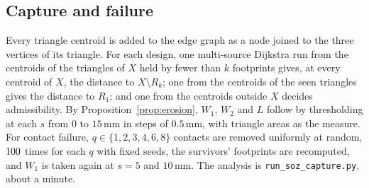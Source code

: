 \documentclass[11pt]{amsart}
\theoremstyle{definition}
\theoremstyle{remark}
\begin{document}
\subsection*{Capture and failure}
Every triangle centroid is added to the edge graph as a node joined to the
three vertices of its triangle. For each design, one multi-source Dijkstra run
from the centroids of the triangles of $X$ held by fewer than $k$ footprints
gives, at every centroid of $X$, the distance to $X\setminus R_k$; one from
the centroids of the seen triangles gives the distance to $R_1$; and one from
the centroids outside $X$ decides admissibility. By
Proposition~\ref{prop:erosion}, $W_1$, $W_2$ and $L$ follow by thresholding at
each $s$ from $0$ to $15$\,mm in steps of $0.5$\,mm, with triangle areas as the
measure. For contact failure, $q\in\{1,2,3,4,6,8\}$ contacts are removed
uniformly at random, $100$ times for each $q$ with fixed seeds, the
survivors' footprints are recomputed, and $W_1$ is taken again at $s=5$ and
$10$\,mm. The analysis is \texttt{run\_soz\_capture.py}, about a minute.
\end{document}
